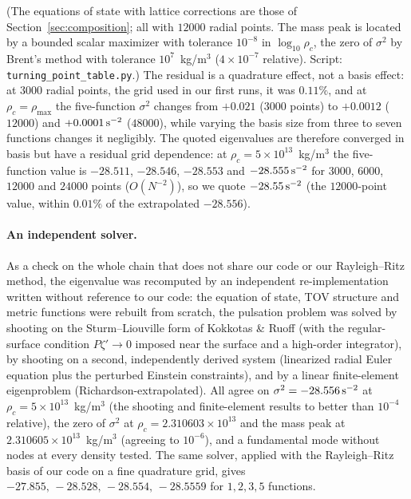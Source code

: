 \documentclass[11pt]{article}
\begin{document}
(The equations of state with lattice corrections are those of Section~\ref{sec:composition}; all with $12000$ radial points. The mass peak is located by a bounded scalar maximizer with tolerance $10^{-8}$ in $\log_{10}\rho_c$, the zero of $\sigma^2$ by Brent's method with tolerance $10^{7}$~kg/m$^3$ ($4\times10^{-7}$ relative). Script: \texttt{turning\_point\_table.py}.) The residual is a quadrature effect, not a basis effect: at $3000$ radial points, the grid used in our first runs, it was $0.11\%$, and at $\rho_c=\rho_{\max}$ the five-function $\sigma^2$ changes from $+0.021$ ($3000$ points) to $+0.0012$ ($12000$) and $+0.0001\,{\rm s}^{-2}$ ($48000$), while varying the basis size from three to seven functions changes it negligibly. The quoted eigenvalues are therefore converged in basis but have a residual grid dependence: at $\rho_c=5\times10^{13}$~kg/m$^3$ the five-function value is $-28.511$, $-28.546$, $-28.553$ and $-28.555\,{\rm s}^{-2}$ for $3000$, $6000$, $12000$ and $24000$ points ($O(N^{-2})$), so we quote $-28.55\,{\rm s}^{-2}$ (the $12000$-point value, within $0.01\%$ of the extrapolated $-28.556$).

\paragraph{An independent solver.} As a check on the whole chain that does not share our code or our Rayleigh--Ritz method, the eigenvalue was recomputed by an independent re-implementation written without reference to our code: the equation of state, TOV structure and metric functions were rebuilt from scratch, the pulsation problem was solved by shooting on the Sturm--Liouville form of Kokkotas \& Ruoff (with the regular-surface condition $P\zeta'\to0$ imposed near the surface and a high-order integrator), by shooting on a second, independently derived system (linearized radial Euler equation plus the perturbed Einstein constraints), and by a linear finite-element eigenproblem (Richardson-extrapolated). All agree on $\sigma^2=-28.556\,{\rm s}^{-2}$ at $\rho_c=5\times10^{13}$~kg/m$^3$ (the shooting and finite-element results to better than $10^{-4}$ relative), the zero of $\sigma^2$ at $\rho_c=2.310603\times10^{13}$ and the mass peak at $2.310605\times10^{13}$~kg/m$^3$ (agreeing to $10^{-6}$), and a fundamental mode without nodes at every density tested. The same solver, applied with the Rayleigh--Ritz basis of our code on a fine quadrature grid, gives $-27.855,\,-28.528,\,-28.554,\,-28.5559$ for $1,2,3,5$ functions.
\end{document}

